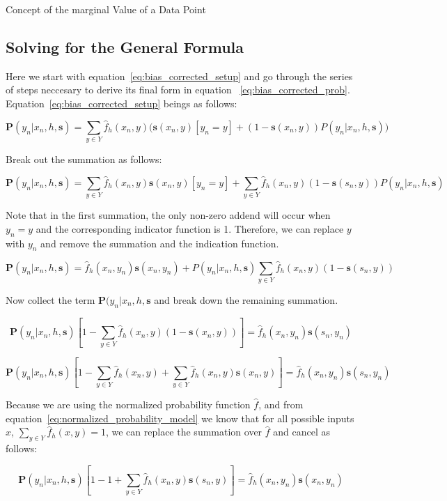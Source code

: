 \documentclass[twoside]{article}
\begin{document}
Concept of the marginal Value of a Data Point

\begin{appendices}

\section{Solving for the General Formula}
\label{appendix:solving}

Here we start with equation~\eqref{eq:bias_corrected_setup} and go through the series of steps neccesary to derive its final form in equation ~\eqref{eq:bias_corrected_prob}. Equation~\eqref{eq:bias_corrected_setup} beings as follows:

\[\mathbf{P}(y_n|x_n,h,\mathbf{s})=\sum_{y \in Y}\hat{f}_h(x_n,y)\big(\mathbf{s}(x_n,y)\left [y_n = y\right ] + (1-\mathbf{s}(x_n,y))P(y_n|x_n,h,\mathbf{s})\big)\]

Break out the summation as follows:

\[\mathbf{P}(y_n|x_n,h,\mathbf{s})=\sum_{y \in Y}\hat{f}_h(x_n,y)\mathbf{s}(x_n,y)\left [y_n = y\right ] +\sum_{y \in Y}\hat{f}_h(x_n,y)(1-\mathbf{s}(s_n,y))P(y_n|x_n,h,\mathbf{s})\]

Note that in the first summation, the only non-zero addend will occur when \(y_n = y\) and the corresponding indicator function is 1. Therefore, we can replace \(y\) with \(y_n\) and remove the summation and the indication function.

\[\mathbf{P}(y_n|x_n,h,\mathbf{s})=\hat{f}_h(x_n,y_n)\mathbf{s}(x_n,y_n) +P(y_n|x_n,h,\mathbf{s})\sum_{y \in Y}\hat{f}_h(x_n,y)(1-\mathbf{s}(s_n,y))\]

Now collect the term \(\mathbf{P}(y_n|x_n,h,\mathbf{s}\) and break down the remaining summation.

\[\mathbf{P}(y_n|x_n,h,\mathbf{s})\left [ 1 - \sum_{y \in Y}\hat{f}_h(x_n,y)(1-\mathbf{s}(x_n,y)) \right ]=\hat{f}_h(x_n,y_n)\mathbf{s}(s_n,y_n) \]

\[\mathbf{P}(y_n|x_n,h,\mathbf{s})\left [ 1 - \sum_{y \in Y}\hat{f}_h(x_n,y)+\sum_{y \in Y}\hat{f}_h(x_n,y)\mathbf{s}(x_n,y) \right ]=\hat{f}_h(x_n,y_n)\mathbf{s}(s_n,y_n) \]

Because we are using the normalized probability function \(\hat{f}\), and from equation~\eqref{eq:normalized_probability_model} we know that for all possible inputs \(x\), \(\sum_{y \in Y} \hat{f}_h(x, y) = 1\), we can replace the summation over \(\hat{f}\) and cancel as follows:

\[\mathbf{P}(y_n|x_n,h,\mathbf{s})\left [ 1 - 1+\sum_{y \in Y}\hat{f}_h(x_n,y)\mathbf{s}(s_n,y) \right ]=\hat{f}_h(x_n,y_n)\mathbf{s}(x_n,y_n) \]


\end{appendices}
\end{document}
